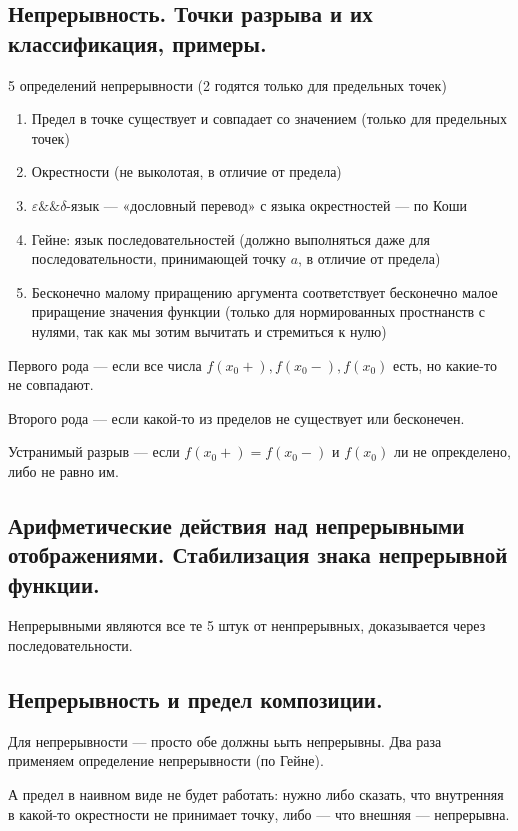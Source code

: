 \documentclass[12pt, a4paper]{article}
\begin{document}
\subsection{Непрерывность. Точки разрыва и их классификация, примеры.}

5 определений непрерывности (2 годятся только для предельных точек)

\begin{enumerate}
    \item Предел в точке существует и совпадает со значением (только для предельных точек)
    \item Окрестности (не выколотая, в отличие от предела)
    \item $\varepsilon \&\& \delta$-язык — «дословный перевод» с языка окрестностей — по Коши
    \item Гейне: язык последовательностей (должно выполняться даже для последовательности, принимающей точку $a$, в отличие от предела)
    \item Бесконечно малому приращению аргумента соответствует бесконечно малое приращение значения функции 
    (только для нормированных простнанств с нулями, так как мы зотим вычитать и стремиться к нулю)
\end{enumerate}

Первого рода — если все числа $f(x_0+), f(x_0-), f(x_0)$ есть, но какие-то не совпадают.

Второго рода — если какой-то из пределов не существует или бесконечен.

Устранимый разрыв — если $f(x_0+) = f(x_0-)$ и $f(x_0)$ ли не опрекделено, либо не равно им.


\subsection{Арифметические действия над непрерывными отображениями. Стабилизация знака непрерывной функции.}

Непрерывными являются все те 5 штук от ненпрерывных, доказывается через последовательности.

\subsection{Непрерывность и предел композиции.}

Для непрерывности — просто обе должны ьыть непрерывны. 
Два раза применяем определение непрерывности (по Гейне).

А предел в наивном виде не будет работать: 
нужно либо сказать, что внутренняя в какой-то окрестности не принимает точку, 
либо — что внешняя — непрерывна.
\end{document}
